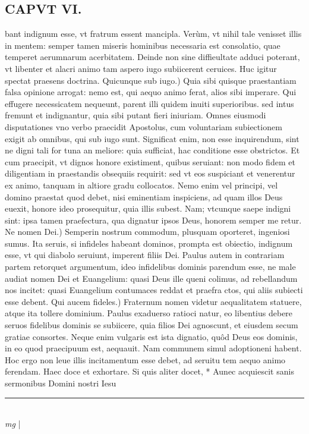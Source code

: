 \documentclass{article}
\begin{document}
\begin{pages}
\section*{CAPVT VI. }
\marginpar{[ p.73 ]}\pstart bant indignum esse, vt fratrum essent mancipla. Verùm, vt nihil tale venisset illis in mentem: semper tamen miseris hominibus necessaria est consolatio, quae temperet aerumnarum acerbitatem. Deinde non sine diffieultate adduci poterant, vt libenter et alacri animo tam aspero iugo subiicerent ceruices. Huc igitur spectat praesens doctrina.  \pend\pstart Quicunque sub iugo.) Quia sibi quisque praestantiam falsa opinione arrogat: nemo est, qui aequo animo ferat, alios sibi imperare. Qui effugere necessicatem nequeunt, parent illi quidem inuiti superioribus. sed intus fremunt et indignantur, quia sibi putant fieri iniuriam. Omnes eiusmodi disputationes vno verbo praecidit Apostolus, cum voluntariam subiectionem exigit ab omnibus, qui sub iugo sunt. Significat enim, non esse inquirendum, sint ne digni tali for tuna an meliore: quia sufficiat, hac conditione esse obstrictos. Et cum praecipit, vt dignos honore existiment, quibus seruiant: non modo fidem et diligentiam in praestandis obsequiis requirit: sed vt eos suspiciant et venerentur ex animo, tanquam in altiore gradu collocatos. Nemo enim vel principi, vel domino praestat quod debet, nisi eminentiam inspiciens, ad quam illos Deus euexit, honore ideo prosequitur, quia illis subest. Nam; vtcunque saepe indigni sint: ipsa tamen praefectura, qua dignatur ipsos Deus, honorem semper me retur.  \pend\pstart Ne nomen Dei.) Semperin nostrum commodum, plusquam oporteret, ingeniosi sumus. Ita seruis, si infideles habeant dominos, prompta est obiectio, indignum esse, vt qui diabolo seruiunt, imperent filiis Dei. Paulus autem in contrariam partem retorquet argumentum, ideo infidelibus dominis parendum esse, ne male audiat nomen Dei et Euangelium: quasi Deus ille queni colimus, ad rebellandum nos incitet: quasi Euangelium contumaces reddat et praefra ctos, qui aliis subiecti esse debent.  \pend\pstart Qui aucem fideles.) Fraternum nomen videtur aequalitatem statuere, atque ita tollere dominium. Paulus exaduerso ratioci natur, eo libentius debere seruos fidelibus dominis se subiicere, quia filios Dei agnoscunt, et eiusdem secum gratiae consortes. Neque enim vulgaris est ista dignatio, quôd Deus eos dominis, in eo quod praecipuum est, aequauit. Nam communem simul adoptioneni habent. Hoc ergo non leue illis incitamentum esse debet, ad seruitu tem aequo animo ferendam.  \pend\pstart Haec doce et exhortare. Si quis aliter docet, * Aunec acquiescit sanis sermonibus Domini nostri Iesu  \pend
\vspace{0.5cm}\noindent
\vspace{0.2cm}\rule{1cm}{0.2pt}\\ 
\hspace{0.2cm}\textit{mg}
\footnotesize 
\normalsize| 

\end{pages}
\end{document}
